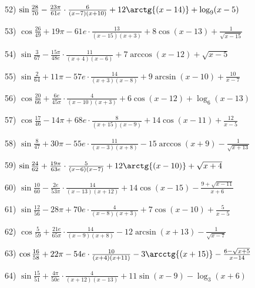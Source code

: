 \documentclass[11pt,ukrainian]{article}
\begin{document}
52) \space 
{ ${\sin\frac{28}{70}} - \frac{23{\pi}}{61 e}\cdot {\frac{6}{(x - 7)(x + 10)}} + {12\arctg{(x - 14)}} + {\log_{9}(x - 5)}$}
\smallskip\par
53) \space 
{ ${\cos\frac{26}{49}} + 19{\pi} - 61 e\cdot {\frac{13}{(x - 15)(x + 3)}} + {8\cos{(x - 13)}} + {\frac{1}{\sqrt{x - 15}}}$}
\smallskip\par
54) \space 
{ ${\sin\frac{3}{67}} - \frac{15{\pi}}{48 e}\cdot {\frac{11}{(x + 4)(x - 6)}} + {7\arccos{(x - 12)}} + {\sqrt{x - 5}}$}
\smallskip\par
55) \space 
{ ${\sin\frac{2}{64}} + 11{\pi} - 57 e\cdot {\frac{14}{(x + 3)(x - 8)}} + {9\arcsin{(x - 10)}} + { \frac{10}{x - 7}}$}
\smallskip\par
56) \space 
{ ${\cos\frac{20}{66}} + \frac{6 e}{45{\pi}}\cdot {\frac{4}{(x - 10)(x + 3)}} + {6\cos{(x - 12)}} + {\log_{6}(x - 13)}$}
\smallskip\par
57) \space 
{ ${\cos\frac{17}{46}} - 14{\pi} + 68 e\cdot {\frac{8}{(x + 15)(x - 9)}} + {14\cos{(x - 11)}} + { \frac{12}{x - 5}}$}
\smallskip\par
58) \space 
{ ${\sin\frac{8}{47}} + 30{\pi} - 55 e\cdot {\frac{11}{(x - 3)(x + 8)}} - {15\arccos{(x + 9)}} - {\frac{1}{\sqrt{x + 13}}}$}
\smallskip\par
59) \space 
{ ${\sin\frac{24}{62}} + \frac{19{\pi}}{63 e}\cdot {\frac{5}{(x - 6)(x - 7)}} + {12\arctg{(x - 10)}} + {\sqrt{x + 4}}$}
\smallskip\par
60) \space 
{ ${\sin\frac{10}{60}} - \frac{2 e}{53{\pi}}\cdot {\frac{14}{(x - 13)(x + 12)}} + {14\cos{(x - 15)}} - {\frac{9 + \sqrt{x - 11}}{x + 6}}$}
\smallskip\par
61) \space 
{ ${\sin\frac{12}{56}} - 28{\pi} + 70 e\cdot {\frac{4}{(x - 8)(x + 3)}} + {7\cos{(x - 10)}} + { \frac{5}{x - 5}}$}
\smallskip\par
62) \space 
{ ${\cos\frac{5}{59}} + \frac{21 e}{65{\pi}}\cdot {\frac{14}{(x - 9)(x + 8)}} - {12\arcsin{(x + 13)}} - {\frac{1}{\sqrt{x - 7}}}$}
\smallskip\par
63) \space 
{ ${\cos\frac{16}{58}} + 22{\pi} - 54 e\cdot {\frac{10}{(x + 4)(x + 11)}} - {3\arcctg{(x + 15)}} - {\frac{6 - \sqrt{x + 5}}{x - 14}}$}
\smallskip\par
64) \space 
{ ${\sin\frac{15}{51}} + \frac{4{\pi}}{50 e}\cdot {\frac{4}{(x + 12)(x - 13)}} + {11\sin{(x - 9)}} - {\log_{3}(x + 6)}$}
\smallskip\par
\end{document}
